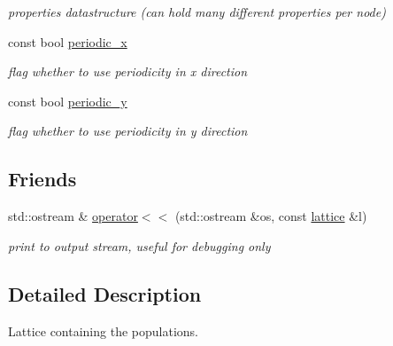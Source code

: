 \begin{DoxyCompactItemize}
\begin{DoxyCompactList}\small\item\em properties datastructure (can hold many different properties per node) \end{DoxyCompactList}\item 
\hypertarget{classlb_1_1lattice_a880c4494108f972a0ef603c8309460d8}{const bool \hyperlink{classlb_1_1lattice_a880c4494108f972a0ef603c8309460d8}{periodic\-\_\-x}}\label{classlb_1_1lattice_a880c4494108f972a0ef603c8309460d8}

\begin{DoxyCompactList}\small\item\em flag whether to use periodicity in x direction \end{DoxyCompactList}\item 
\hypertarget{classlb_1_1lattice_a761296d72fa4712bd0b4252158987972}{const bool \hyperlink{classlb_1_1lattice_a761296d72fa4712bd0b4252158987972}{periodic\-\_\-y}}\label{classlb_1_1lattice_a761296d72fa4712bd0b4252158987972}

\begin{DoxyCompactList}\small\item\em flag whether to use periodicity in y direction \end{DoxyCompactList}\end{DoxyCompactItemize}
\subsection*{\-Friends}
\begin{DoxyCompactItemize}
\item 
\hypertarget{classlb_1_1lattice_af1be297b99671a6a95f561ff91d34657}{std\-::ostream \& \hyperlink{classlb_1_1lattice_af1be297b99671a6a95f561ff91d34657}{operator$<$$<$} (std\-::ostream \&os, const \hyperlink{classlb_1_1lattice}{lattice} \&l)}\label{classlb_1_1lattice_af1be297b99671a6a95f561ff91d34657}

\begin{DoxyCompactList}\small\item\em print to output stream, useful for debugging only \end{DoxyCompactList}\end{DoxyCompactItemize}


\subsection{\-Detailed \-Description}
\-Lattice containing the populations. 

